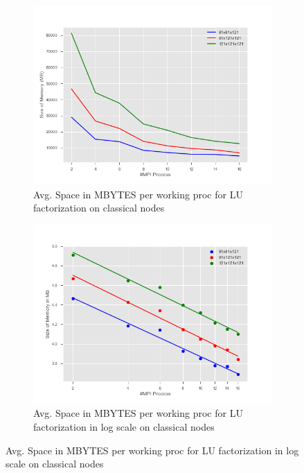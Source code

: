 \begin{figure}
\centering 
  \begin{subfigure}[b]{0.7\textwidth}
    \includegraphics[width=\textwidth]{images/memoryMPI.png}
    \caption{Avg. Space in MBYTES per working proc for LU factorization on classical nodes }
    \label{memoryMPI}
  \end{subfigure}
  \begin{subfigure}[b]{0.7\textwidth}
    \includegraphics[width=\textwidth]{images/MemoryMPIlog.png}
    \caption{Avg. Space in MBYTES per working proc for LU factorization in log scale on classical nodes}
    \label{MemoryMPIlog}
  \end{subfigure}
\end{figure} 

